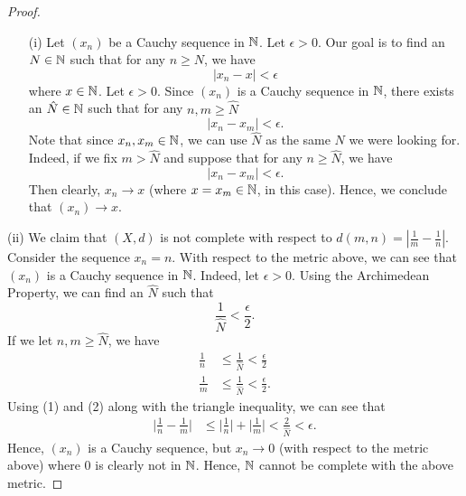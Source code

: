 \documentclass[a4paper]{article}
\begin{document}
\begin{proof}
\begin{enumerate}
    \item[(i)] Let \( ({x}_{n}) \) be a Cauchy sequence in \( \mathbb{N} \). Let \( \epsilon > 0  \). Our goal is to find an \( N \in \mathbb{N}  \) such that for any \( n \geq N  \), we have  
        \[  | {x}_{n} - x | < \epsilon \]
        where \( x \in \mathbb{N} \). Let \( \epsilon > 0 \). Since \( ({x}_{n}) \) is a Cauchy sequence in \( \mathbb{N} \), there exists an \( \hat{N} \in \mathbb{N} \) such that for any \( n,m \geq \hat{N} \)
        \[  | {x}_{n} - {x}_{m} | < \epsilon. \]
        Note that since \( {x}_{n}, {x}_{m} \in \mathbb{N} \), we can use \( \hat{N}  \) as the same \( N  \) we were looking for. Indeed, if we fix \( m > \hat{N} \) and suppose that for any \( n \geq \hat{N}  \), we have 
        \[  | {x}_{n} - {x}_{m} | <  \epsilon. \]
        Then clearly, \( {x}_{n} \to x  \) (where \( x = {x}_{m} \in \mathbb{N} \), in this case). Hence, we conclude that \( ({x}_{n}) \to x  \).
\end{enumerate}
\item[(ii)] We claim that \( (X,d) \) is not complete with respect to \( d(m,n) = | \frac{ 1 }{ m }  - \frac{ 1 }{ n }  |  \). Consider the sequence \( {x}_{n} = n \). With respect to the metric above, we can see that \( ({x}_{n}) \) is a Cauchy sequence in \( \mathbb{N} \). Indeed, let \( \epsilon > 0  \). Using the Archimedean Property, we can find an \( \hat{N} \) such that  
    \[  \frac{ 1 }{ \hat{N} } < \frac{ \epsilon }{ 2 }. \]
    If we let \( n,m \geq \hat{N} \), we have 
    \begin{align*}
        \frac{ 1 }{ n } &\leq \frac{ 1 }{ \hat{N} } < \frac{ \epsilon }{ 2 } \tag{1}  \\
        \frac{ 1 }{ m }  &\leq \frac{ 1 }{ \hat{N} }  < \frac{ \epsilon }{ 2 }. \tag{2}
    \end{align*}
    Using (1) and (2) along with the triangle inequality, we can see that 
    \begin{align*}
        \Big| \frac{ 1 }{ n }  - \frac{ 1 }{ m }  \Big|  &\leq \Big| \frac{ 1 }{ n }  \Big| + \Big| \frac{ 1 }{ m }  \Big|   
        < \frac{ 2 }{ \hat{N} } < \epsilon.
    \end{align*}
    Hence, \( ({x}_{n}) \) is a Cauchy sequence, but \( {x}_{n} \to 0  \) (with respect to the metric above) where \( 0  \) is clearly not in \( \mathbb{N} \). Hence, \( \mathbb{N} \) cannot be complete with the above metric.
\end{proof}
\end{document}
